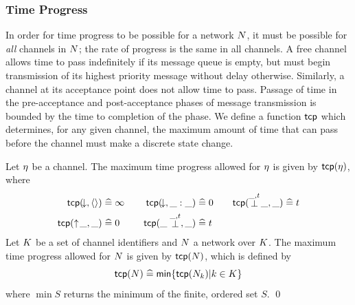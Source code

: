 \subsubsection{Time Progress}
In order for time progress to be possible for a network $\N$, it must
be possible for \emph{all} channels in $\N$; the rate of progress is
the same in all channels.  A free channel allows time to pass
indefinitely if its message queue is empty, but must begin
transmission of its highest priority message without delay
otherwise. Similarly, a channel at its acceptance point does not allow
time to pass. Passage of time in the pre-acceptance and
post-acceptance phases of message transmission is bounded by the time
to completion of the phase. We define a function $\tcp$ which
determines, for any given channel, the maximum amount of time that can
pass before the channel must make a discrete state change.
\begin{definition}\label{def:bctcp}
Let $\channel$ be a channel. The maximum time progress allowed for
$\channel$ is given by $\tcp(\channel)$, where
\begin{alignat*}{3}
\tcp(\free,\langle\rangle) & \defs \infinity & \quad \tcp(\free,\_:\_) & \defs  0 & \quad \tcp(\preact{\_,\ti}{\_},\_) & \defs  \ti \\ 
\tcp(\offers{\_},\_) & \defs  0  & \quad \tcp(\postact{\_,\ti}{\_},\_) & \defs  \ti && \\
\end{alignat*}
Let $\K$ be a set of channel identifiers and $\N$ a network over $\K$. 
The maximum time progress allowed for $\N$ is
given by $\tcp(\N)$, which is defined by
\[
\tcp(\N) \defs \min\{\tcp(\N_\kk) | \kk \in \K\}
\]
where $\min S$ returns the minimum of the finite, ordered set $S$.
\qed
\end{definition}

